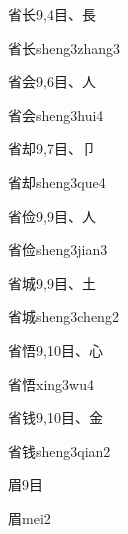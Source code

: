 \begin{entry}{省长}{9,4}{⽬、⾧}
  \begin{phonetics}{省长}{sheng3zhang3}
  \end{phonetics}
\end{entry}

\begin{entry}{省会}{9,6}{⽬、⼈}
  \begin{phonetics}{省会}{sheng3hui4}
  \end{phonetics}
\end{entry}

\begin{entry}{省却}{9,7}{⽬、⼙}
  \begin{phonetics}{省却}{sheng3que4}
  \end{phonetics}
\end{entry}

\begin{entry}{省俭}{9,9}{⽬、⼈}
  \begin{phonetics}{省俭}{sheng3jian3}
  \end{phonetics}
\end{entry}

\begin{entry}{省城}{9,9}{⽬、⼟}
  \begin{phonetics}{省城}{sheng3cheng2}
  \end{phonetics}
\end{entry}

\begin{entry}{省悟}{9,10}{⽬、⼼}
  \begin{phonetics}{省悟}{xing3wu4}
  \end{phonetics}
\end{entry}

\begin{entry}{省钱}{9,10}{⽬、⾦}
  \begin{phonetics}{省钱}{sheng3qian2}
  \end{phonetics}
\end{entry}

\begin{entry}{眉}{9}{⽬}
  \begin{phonetics}{眉}{mei2}
  \end{phonetics}
\end{entry}

